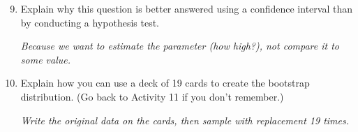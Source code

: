 \begin{enumerate}
 \setcounter{enumi}{8}
\item  Explain why this question is better answered using a confidence
  interval than by conducting a hypothesis test. 
\begin{students}
  \vspace{1cm}
\end{students}
\begin{key}
  {\it  Because we want to estimate the parameter (how high?), not
    compare it to some value.}
\end{key}

\item  Explain how you can use a deck of 19 cards to create the
  bootstrap distribution. (Go back to Activity 11 if you don't remember.)
\begin{students}
  \vspace{1cm}
\end{students}
\begin{key}
  {\it Write the original data on the cards, then sample with replacement 19
    times.}
\end{key}


  


\end{enumerate}
